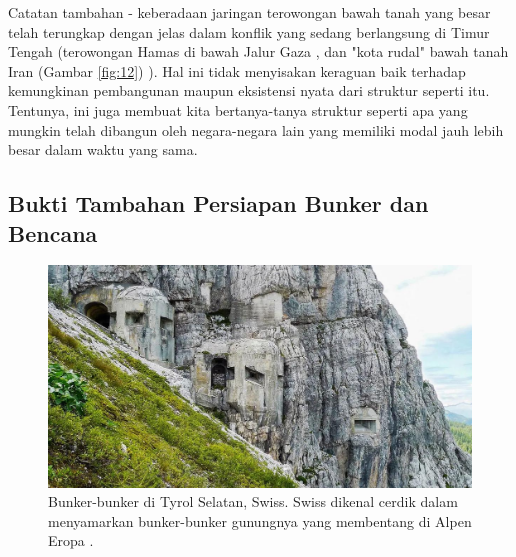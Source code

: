 \documentclass[10pt,twocolumn,letterpaper]{article}
\begin{document}
Catatan tambahan - keberadaan jaringan terowongan bawah tanah yang besar telah terungkap dengan jelas dalam konflik yang sedang berlangsung di Timur Tengah (terowongan Hamas di bawah Jalur Gaza \cite{38}, dan "kota rudal" bawah tanah Iran (Gambar \ref{fig:12}) \cite{39,40}). Hal ini tidak menyisakan keraguan baik terhadap kemungkinan pembangunan maupun eksistensi nyata dari struktur seperti itu. Tentunya, ini juga membuat kita bertanya-tanya struktur seperti apa yang mungkin telah dibangun oleh negara-negara lain yang memiliki modal jauh lebih besar dalam waktu yang sama.

\subsection{Bukti Tambahan Persiapan Bunker dan Bencana}

\begin{figure}[t]
\begin{center}
   \includegraphics[width=1\linewidth]{tyrol.jpg}
\end{center}
   \caption{Bunker-bunker di Tyrol Selatan, Swiss. Swiss dikenal cerdik dalam menyamarkan bunker-bunker gunungnya yang membentang di Alpen Eropa \cite{32}.}
\label{fig:7}
\label{fig:onecol}
\end{figure}
\end{document}
